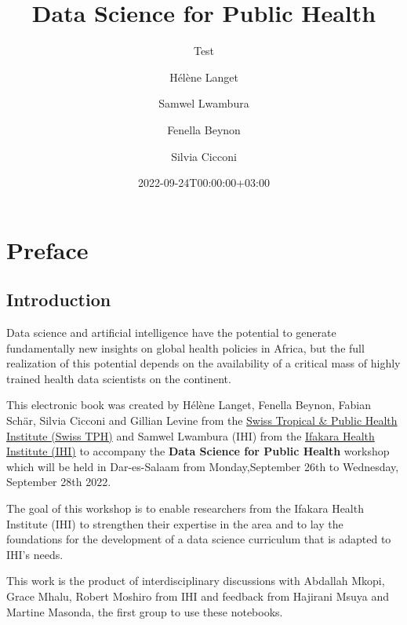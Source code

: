 \documentclass[
  letterpaper,
  DIV=11,
  numbers=noendperiod]{scrreprt}
\title{Data Science for Public Health}
\subtitle{Test}
\author{Hélène Langet \and Samwel Lwambura \and Fenella
Beynon \and Silvia Cicconi}
\date{2022-09-24T00:00:00+03:00}
\renewcommand*\contentsname{Table of contents}
\newcommand\contentsname{Table of contents}
\begin{document}
\maketitle
\ifdefined\Shaded\renewenvironment{Shaded}{\begin{tcolorbox}[frame hidden, boxrule=0pt, borderline west={3pt}{0pt}{shadecolor}, enhanced, sharp corners, interior hidden, breakable]}{\end{tcolorbox}}\fi

\renewcommand*\contentsname{Table of contents}
{
\hypersetup{linkcolor=}
\setcounter{tocdepth}{2}
\tableofcontents
}

\hypertarget{preface}{%
\chapter*{Preface}\label{preface}}

\hypertarget{introduction}{%
\section*{Introduction}\label{introduction}}

Data science and artificial intelligence have the potential to generate
fundamentally new insights on global health policies in Africa, but the
full realization of this potential depends on the availability of a
critical mass of highly trained health data scientists on the continent.

This electronic book was created by Hélène Langet, Fenella Beynon,
Fabian Schär, Silvia Cicconi and Gillian Levine from the
\href{https://www.swisstph.ch}{Swiss Tropical \& Public Health Institute
(Swiss TPH)} and Samwel Lwambura (IHI) from the
\href{https://ihi.or.tz/}{Ifakara Health Institute (IHI)} to accompany
the \textbf{Data Science for Public Health} workshop which will be held
in Dar-es-Salaam from Monday,September 26th to Wednesday, September 28th
2022.

The goal of this workshop is to enable researchers from the Ifakara
Health Institute (IHI) to strengthen their expertise in the area and to
lay the foundations for the development of a data science curriculum
that is adapted to IHI's needs.

This work is the product of interdisciplinary discussions with Abdallah
Mkopi, Grace Mhalu, Robert Moshiro from IHI and feedback from Hajirani
Msuya and Martine Masonda, the first group to use these notebooks.
\end{document}
